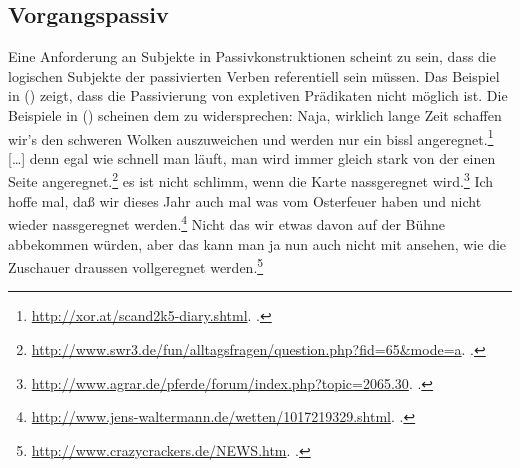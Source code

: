

\subsection{Vorgangspassiv}
\label{sec-agentive-pas}


Eine Anforderung an Subjekte in Passivkonstruktionen scheint zu sein, dass
die logischen Subjekte der passivierten Verben referentiell sein müssen. Das Beispiel
in () zeigt, dass die Passivierung von expletiven Prädikaten nicht
möglich ist.
\z
Die Beispiele in () scheinen dem zu widersprechen:
\eal\label{ex-passiv-mit-regnen+praed}
\ex Naja, wirklich lange Zeit schaffen wir's den schweren Wolken auszuweichen und
werden nur ein bissl angeregnet.\footnote{
\url{http://xor.at/scand2k5-diary.shtml}. .
}
\ex {}[\ldots] denn egal wie schnell man läuft, man wird immer gleich
stark von der einen Seite angeregnet.\footnote{
  \url{http://www.swr3.de/fun/alltagsfragen/question.php?fid=65&mode=a}. .
}
\ex es ist nicht schlimm, wenn die Karte nassgeregnet wird.\footnote{
\url{http://www.agrar.de/pferde/forum/index.php?topic=2065.30}. .%
}
\ex Ich hoffe mal, daß wir dieses Jahr auch mal was vom Osterfeuer haben und nicht wieder nassgeregnet werden.\footnote{
  \url{http://www.jens-waltermann.de/wetten/1017219329.shtml}. .
}
\ex Nicht das wir etwas davon auf der Bühne abbekommen würden, 
    aber das kann man ja nun auch nicht mit ansehen, wie die Zuschauer draussen vollgeregnet werden.\footnote{
\url{http://www.crazycrackers.de/NEWS.htm}. .
}

